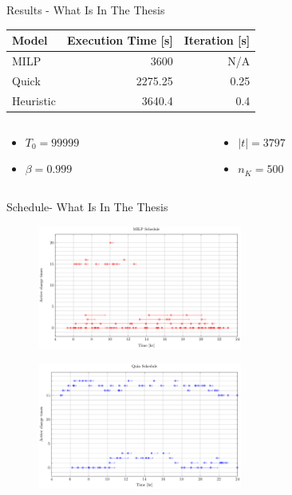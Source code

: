 \documentclass[bigger]{beamer}
\begin{document}
\begin{frame}[label={sec:orgec63e3f}]{Results - What Is In The Thesis}
\begin{center}
\begin{tabular}{lrr}
\alert{Model} & \alert{Execution Time} [s] & \alert{Iteration} [s]\\[0pt]
\hline
MILP & 3600 & N/A\\[0pt]
Quick & 2275.25 & 0.25\\[0pt]
Heuristic & 3640.4 & 0.4\\[0pt]
\end{tabular}
\end{center}

\begin{columns}
\begin{column}{0.5\columnwidth}
\begin{itemize}
\item \(T_0 = 99999\)
\item \(\beta = 0.999\)
\end{itemize}
\end{column}
\begin{column}{0.5\columnwidth}
\begin{itemize}
\item \(|t| = 3797\)
\item \(n_K = 500\)
\end{itemize}
\end{column}
\end{columns}
\end{frame}

\begin{frame}[label={sec:orga317657}]{Schedule- What Is In The Thesis}
\begin{figure}[htpb]
\centering
    \includegraphics[width=0.6\textwidth]{img/sa-pap-paper-bad/schedule-milp}
\end{figure}
\begin{figure}[htpb]
\centering
    \includegraphics[width=0.6\textwidth]{img/sa-pap-paper-bad/schedule-quinn}
\end{figure}
\end{frame}
\end{document}
